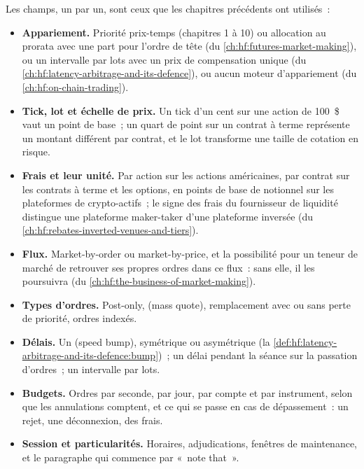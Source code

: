 Les champs, un par un, sont ceux que les chapitres précédents ont utilisés~:
\begin{itemize}
\item \textbf{Appariement.} Priorité prix-temps (chapitres 1 à 10) ou allocation au prorata avec une part pour l'ordre de tête (du \cref{ch:hf:futures-market-making}),
ou un intervalle par lots avec un prix de compensation unique (du \cref{ch:hf:latency-arbitrage-and-its-defence}), ou aucun moteur d'appariement
(du \cref{ch:hf:on-chain-trading}).
\item \textbf{Tick, lot et échelle de prix.} Un tick d'un cent sur une action de 100~\$ vaut un point de base~; un quart de point sur un contrat à terme représente un
montant différent par contrat, et le lot transforme une taille de cotation en risque.
\item \textbf{Frais et leur unité.} Par action sur les actions américaines, par contrat sur les contrats à terme et les options, en points de base de notionnel sur les plateformes de crypto-actifs~;
le signe des frais du fournisseur de liquidité distingue une plateforme maker-taker d'une plateforme inversée (du \cref{ch:hf:rebates-inverted-venues-and-tiers}).
\item \textbf{Flux.} Market-by-order ou market-by-price, et la possibilité pour un teneur de marché de retrouver ses propres ordres dans ce flux~: sans elle, il les poursuivra
(du \cref{ch:hf:the-business-of-market-making}).
\item \textbf{Types d'ordres.} Post-only,  (mass quote), remplacement avec ou sans perte de priorité, ordres indexés.
\item \textbf{Délais.} Un  (speed bump), symétrique ou asymétrique (la \cref{def:hf:latency-arbitrage-and-its-defence:bump})~; un délai pendant la séance sur
la passation d'ordres~; un intervalle par lots.
\item \textbf{Budgets.} Ordres par seconde, par jour, par compte et par instrument, selon que les annulations comptent, et ce qui se passe en cas de dépassement~: un rejet, une
déconnexion, des frais.
\item \textbf{Session et particularités.} Horaires, adjudications, fenêtres de maintenance, et le paragraphe qui commence par «~note that~».
\end{itemize}

